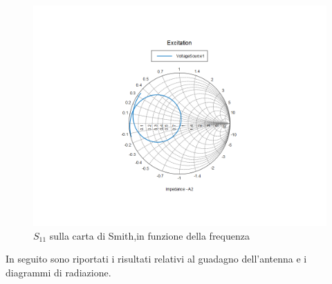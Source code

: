 \documentclass[twoside,twocolumn]{article}
\begin{document}
\begin{figure}[h!]
  \includegraphics[width=\linewidth]{A1_Smith.png}
  \caption{$S_{11} $ sulla carta di Smith,in funzione della frequenza }
  \label{fig:A1_Smith}
\end{figure}

In seguito sono riportati i risultati relativi al guadagno dell'antenna e i diagrammi di radiazione.
\end{document}
